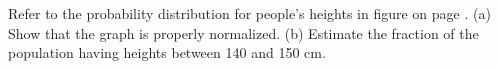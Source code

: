 Refer to the probability distribution for people's
heights in figure  on page \pageref{fig:human-height}.\hwendpart
(a) Show that the graph is properly normalized.\hwendpart
(b) Estimate the fraction of the population having heights
between 140 and 150 cm.\answercheck
